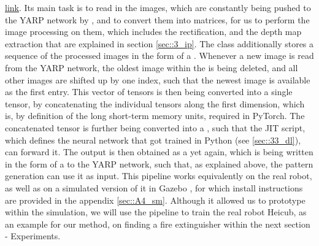 \href{https://github.com/mhubii/nmpc_pattern_generator/blob/719fde0bb73925923de85cbf379c5523e075dfeb/src/behavioural_augmentation_real_robot_external_data.cpp#L108}{\underline{link}}. Its main task is to read in the images, which are constantly being pushed to the YARP network by , and to convert them into  matrices, for us to perform the image processing on them, which includes the rectification, and the depth map extraction that are explained in section \ref{sec::3_ip}. The  class additionally stores a sequence of the processed images in the form of a . Whenever a new image is read from the YARP network, the oldest image within the  is being deleted, and all other images are shifted up by one index, such that the newest image is available as the first entry. This vector of tensors is then being converted into a single tensor, by concatenating the individual tensors along the first dimension, which is, by definition of the long short-term memory units, required in PyTorch. The concatenated tensor is further being converted into a , such that the JIT script, which defines the neural network that got trained in Python (see \ref{sec::33_dl}), can forward it. The output is then obtained as a  yet again, which is being written in the form of a  to the YARP network, such that,  as explained above, the pattern generation can use it as input. This pipeline works equivalently on the real robot, as well as on a simulated version of it in Gazebo \cite{koenig2004design}, for which install instructions are provided in the appendix \ref{sec::A4_sm}. Although it allowed us to prototype within the simulation, we will use the pipeline to train the real robot Heicub, as an example for our method, on finding a fire extinguisher within the next section - Experiments.